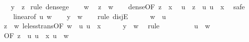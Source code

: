 \begin{isabellebody}
\ \ \ {\isachardoublequoteopen}y\ {\isasymle}\ z{\isachardoublequoteclose}\isanewline
%
\isadelimproof
%
\endisadelimproof
%
\isatagproof
{}\isamarkupfalse%
\ {\isacharparenleft}{\kern0pt}rule\ dense{\isacharunderscore}{\kern0pt}ge{\isacharparenright}{\kern0pt}\isanewline
\ \ \isamarkupfalse%
\ w\ \isamarkupfalse%
\ {\isachardoublequoteopen}z\ {\isacharless}{\kern0pt}\ w{\isachardoublequoteclose}\isanewline
\ \ \isamarkupfalse%
\ dense{\isacharbrackleft}{\kern0pt}OF\ {\isacartoucheopen}z\ {\isacharless}{\kern0pt}\ x{\isacartoucheclose}{\isacharbrackright}{\kern0pt}\ \isamarkupfalse%
\ u\ \ {\isachardoublequoteopen}z\ {\isacharless}{\kern0pt}\ u{\isachardoublequoteclose}\ {\isachardoublequoteopen}u\ {\isacharless}{\kern0pt}\ x{\isachardoublequoteclose}\ \isamarkupfalse%
\ safe\isanewline
\ \ \isamarkupfalse%
\ linear{\isacharbrackleft}{\kern0pt}of\ u\ w{\isacharbrackright}{\kern0pt}\isanewline
\ \ \isamarkupfalse%
\ {\isachardoublequoteopen}y\ {\isasymle}\ w{\isachardoublequoteclose}\isanewline
\ \ \isamarkupfalse%
\ {\isacharparenleft}{\kern0pt}rule\ disjE{\isacharparenright}{\kern0pt}\isanewline
\ \ \ \ \isamarkupfalse%
\ {\isachardoublequoteopen}w\ {\isasymle}\ u{\isachardoublequoteclose}\isanewline
\ \ \ \ \isamarkupfalse%
\ {\isacartoucheopen}z\ {\isacharless}{\kern0pt}\ w{\isacartoucheclose}\ le{\isacharunderscore}{\kern0pt}less{\isacharunderscore}{\kern0pt}trans{\isacharbrackleft}{\kern0pt}OF\ {\isacartoucheopen}w\ {\isasymle}\ u{\isacartoucheclose}\ {\isacartoucheopen}u\ {\isacharless}{\kern0pt}\ x{\isacartoucheclose}{\isacharbrackright}{\kern0pt}\isanewline
\ \ \ \ \isamarkupfalse%
\ {\isachardoublequoteopen}y\ {\isasymle}\ w{\isachardoublequoteclose}\ \isamarkupfalse%
\ {\isacharparenleft}{\kern0pt}rule\ {\isacharasterisk}{\kern0pt}{\isacharparenright}{\kern0pt}\isanewline
\ \ \isamarkupfalse%
\isanewline
\ \ \ \ \isamarkupfalse%
\ {\isachardoublequoteopen}u\ {\isasymle}\ w{\isachardoublequoteclose}\isanewline
\ \ \ \ \isamarkupfalse%
\ {\isacharasterisk}{\kern0pt}{\isacharbrackleft}{\kern0pt}OF\ {\isacartoucheopen}z\ {\isacharless}{\kern0pt}\ u{\isacartoucheclose}\ {\isacartoucheopen}u\ {\isacharless}{\kern0pt}\ x{\isacartoucheclose}{\isacharbrackright}{\kern0pt}\ {\isacartoucheopen}u\ {\isasymle}\ w{\isacartoucheclose}\isanewline
\ \ \ \ \isamarkupfalse%

\end{isabellebody}
